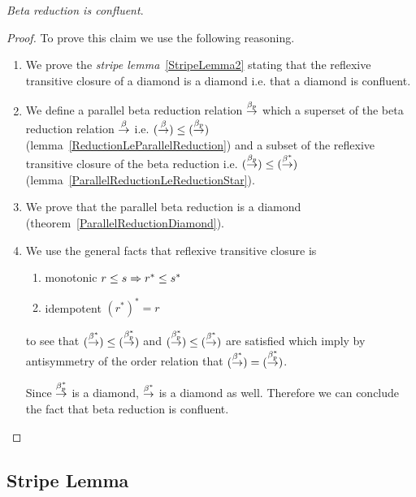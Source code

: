 \begin{theorem}
    \label{ChurchRosser}
    \emph{Beta reduction is confluent}.

    \begin{proof}
    To prove this claim we use the following reasoning.

    \begin{enumerate}

        \item We prove the \emph{stripe lemma}~\ref{StripeLemma2} stating that
        the reflexive transitive closure of a diamond is a diamond i.e. that a
        diamond is confluent.

        \item We define a parallel beta reduction relation $\stackrel{\beta_p}{\to}$ which a
        superset of the beta reduction relation $\stackrel{\beta}{\to}$ i.e.  $(\stackrel{\beta}{\to}) \le
        (\stackrel{\beta_p}{\to})$ (lemma~\ref{ReductionLeParallelReduction}) and a subset of
        the reflexive transitive closure of the beta reduction i.e. $(\stackrel{\beta_p}{\to})
        \le (\stackrel{\beta^*}{\to})$ (lemma~\ref{ParallelReductionLeReductionStar}).

        \item We prove that the parallel beta reduction is a diamond
        (theorem~\ref{ParallelReductionDiamond}).

        \item We use the general facts that reflexive transitive closure is
        \begin{enumerate}
            \item monotonic $r \le s \Rightarrow r^* \le s^*$

            \item idempotent $(r^*)^* = r$
        \end{enumerate}
        to see that $(\stackrel{\beta^*}{\to}) \le (\stackrel{\beta_p^*}{\to})$ and $(\stackrel{\beta_p^*}{\to}) \le
        (\stackrel{\beta^*}{\to})$ are satisfied which imply by antisymmetry of the order
        relation that $(\stackrel{\beta^*}{\to}) = (\stackrel{\beta_p^*}{\to})$.

        Since $\stackrel{\beta_p^*}{\to}$ is a diamond, $\stackrel{\beta^*}{\to}$ is a diamond as well.
        Therefore we can conclude the fact that beta reduction is confluent.
    \end{enumerate}
    \end{proof}
\end{theorem}





\subsection{Stripe Lemma}

